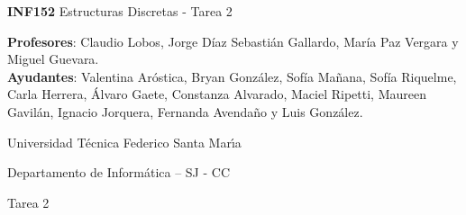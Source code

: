 \documentclass[letterpaper,10pt]{article}
\begin{document}
\thispagestyle{empty}
 	
\begin{minipage}[t]{0.6\textwidth}

{\LARGE \textbf{INF152} Estructuras Discretas - Tarea 2}

{\large \textbf{Profesores}: Claudio Lobos, Jorge Díaz Sebastián Gallardo, María Paz Vergara y Miguel Guevara.}\\
{\small \textbf{Ayudantes}: Valentina Aróstica, Bryan González, Sofía Mañana, Sofía Riquelme, Carla Herrera, Álvaro Gaete, Constanza Alvarado, Maciel Ripetti, Maureen Gavilán, Ignacio Jorquera, Fernanda Avendaño y Luis González.} 

Universidad T\'ecnica Federico Santa Mar\'{\i}a

Departamento de Inform\'atica -- SJ - CC 



\end{minipage}
\hfill



\vspace{0.3cm}


\begin{center}
    \huge Tarea 2
\end{center}
\end{document}
